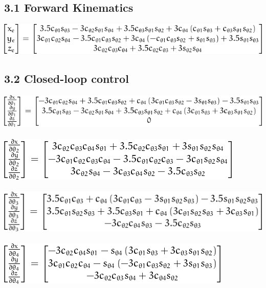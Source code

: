 

\subsection{3.1 Forward Kinematics}

\includegraphics[]{x_y_z.png} \\

\subsection{3.2 Closed-loop control}
\includegraphics[]{jac_col1.png} \\ \\
\includegraphics[]{jac_col2.png} \\ \\
\includegraphics[]{jac_col3.png} \\ \\
\includegraphics[]{jac_col4.png}

\begin{center}
\begin {tabular}{|c||c|c|c|}
\hline
\hline
\end{tabular}
\end{center}
